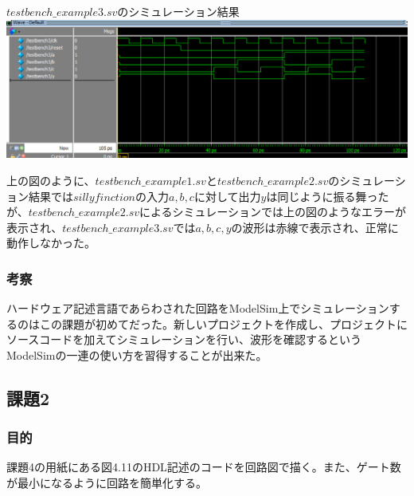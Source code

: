 \documentclass[a4paper]{jarticle}
\begin{document}
\begin{center}
	$testbench\_example3.sv$のシミュレーション結果
	\includegraphics[width=15cm]{1-m-3.PNG}
\end{center}
上の図のように、$testbench\_example1.sv$と$testbench\_example2.sv$のシミュレーション結果では$sillyfinction$の入力$a,b,c$に対して出力$y$は同じように振る舞ったが、$testbench\_example2.sv$によるシミュレーションでは上の図のようなエラーが表示され、$testbench\_example3.sv$では$a,b,c,y$の波形は赤線で表示され、正常に動作しなかった。
\subsubsection{考察}
ハードウェア記述言語であらわされた回路をModelSim上でシミュレーションするのはこの課題が初めてだった。新しいプロジェクトを作成し、プロジェクトにソースコードを加えてシミュレーションを行い、波形を確認するというModelSimの一連の使い方を習得することが出来た。
\subsection{課題2}
\subsubsection{目的}
課題4の用紙にある図4.11のHDL記述のコードを回路図で描く。また、ゲート数が最小になるように回路を簡単化する。
\end{document}

